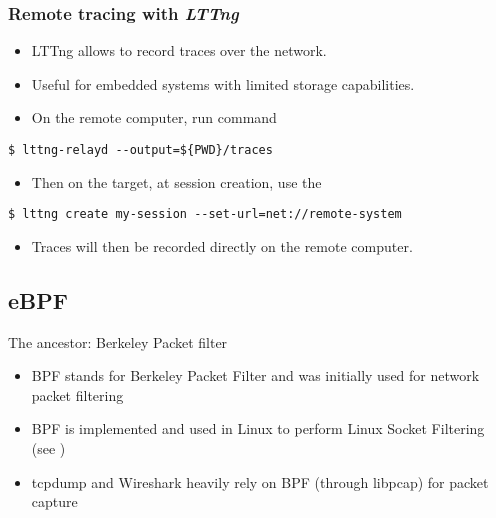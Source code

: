 \begin{frame}[fragile]
  \frametitle{Remote tracing with {\em LTTng}}
  \begin{itemize}
    \item LTTng allows to record traces over the network.
    \item Useful for embedded systems with limited storage capabilities.
    \item On the remote computer, run  command
  \end{itemize}
  \begin{block}{}
    \begin{verbatim}
$ lttng-relayd --output=${PWD}/traces
   \end{verbatim}
  \end{block}
  \begin{itemize}
    \item Then on the target, at session creation, use the 
  \end{itemize}
  \begin{block}{}
    \begin{verbatim}
$ lttng create my-session --set-url=net://remote-system
   \end{verbatim}
  \end{block}
  \begin{itemize}
    \item Traces will then be recorded directly on the remote computer.
  \end{itemize}
\end{frame}

\subsection{eBPF}

\begin{frame}{The ancestor: Berkeley Packet filter}
  \begin{itemize}
    \item BPF stands for Berkeley Packet Filter and was initially used
    for network packet filtering
    \item BPF is implemented and used in Linux to perform Linux Socket
    Filtering (see )
    \item tcpdump and Wireshark heavily rely on BPF (through libpcap) for
    packet capture
  \end{itemize}
\end{frame}


